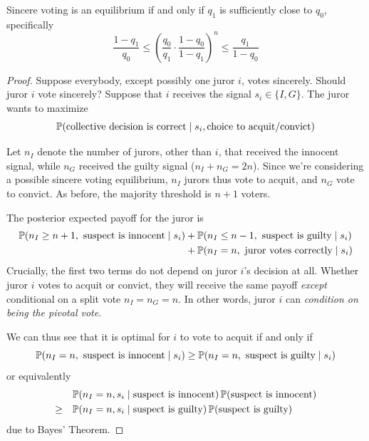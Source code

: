 \documentclass[../../../main.tex]{subfiles}
\begin{document}
\begin{theorem}
    Sincere voting is an equilibrium if and only if $q_1$ is sufficiently close to $q_0$, specifically
    \begin{equation*}
        \frac{1-q_1}{q_0}\leq \left(\frac{q_0}{q_1}\cdot\frac{1-q_0}{1-q_1}\right)^n\leq \frac{q_1}{1-q_0}
    \end{equation*}
    \begin{proof}
        Suppose everybody, except possibly one juror $i$, votes sincerely. Should juror $i$ vote sincerely?
        Suppose that $i$ receives the signal $s_i\in\{I,G\}$. 
        The juror wants to maximize
        \begin{equation*}
        \mathbb{P}(\textrm{collective decision is correct}\mid s_i, \textrm{choice to acquit/convict})
        \end{equation*}
        
        Let $n_I$ denote the number of jurors, other than $i$, that received the innocent signal, while $n_G$ received the guilty signal ($n_I+n_G=2n$).
        Since we're considering a possible sincere voting equilibrium, $n_I$ jurors thus vote to acquit, and $n_G$ vote to convict.
        As before, the majority threshold is $n+1$ voters.

        The posterior expected payoff for the juror is 
        \begin{align*}
            \mathbb{P}(n_I\geq n+1,\textrm{ suspect is innocent}\mid s_i)&+\mathbb{P}(n_I\leq n-1,\textrm{ suspect is guilty}\mid s_i)\\
            &+\mathbb{P}(n_I=n,\textrm{ juror votes correctly}\mid s_i)
        \end{align*}
        Crucially, the first two terms do not depend on juror $i$'s decision at all.
        Whether juror $i$ votes to acquit or convict, they will receive the same payoff \textit{except} conditional on a split vote $n_I=n_G=n$.
        In other words, juror $i$ can \textit{condition on being the pivotal vote}.
        
        We can thus see that it is optimal for $i$ to vote to acquit if and only if
        \begin{equation*}
            \mathbb{P}(n_I=n,\textrm{ suspect is innocent}\mid s_i)\geq \mathbb{P}(n_I=n,\textrm{ suspect is guilty}\mid s_i)
        \end{equation*}
        or equivalently
        \begin{align*}
            &\mathbb{P}(n_I=n,s_i\mid \textrm{suspect is innocent})\,\mathbb{P}(\textrm{suspect is innocent})\\
            \geq\quad &\mathbb{P}(n_I=n,s_i\mid\textrm{suspect is guilty})\,\mathbb{P}(\textrm{suspect is guilty})
        \end{align*}
        due to Bayes' Theorem.


\end{proof}
\end{theorem}
\end{document}

